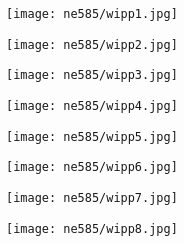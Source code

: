 \documentclass[aspectratio=1610,pdftex,dvipsnames,compress,xcolor={dvipsnames}]{beamer}
\begin{document}
\begin{frame}{}
    \begin{figure}
        \centering
        \texttt{[image: ne585/wipp1.jpg]}
    \end{figure}
\end{frame}


\begin{frame}{}
    \begin{figure}
        \centering
        \texttt{[image: ne585/wipp2.jpg]}
    \end{figure}
\end{frame}


\begin{frame}{}
    \begin{figure}
        \centering
        \texttt{[image: ne585/wipp3.jpg]}
    \end{figure}
\end{frame}


\begin{frame}{}
    \begin{figure}
        \centering
        \texttt{[image: ne585/wipp4.jpg]}
    \end{figure}
\end{frame}


\begin{frame}{}
    \begin{figure}
        \centering
        \texttt{[image: ne585/wipp5.jpg]}
    \end{figure}
\end{frame}


\begin{frame}{}
    \begin{figure}
        \centering
        \texttt{[image: ne585/wipp6.jpg]}
    \end{figure}
\end{frame}


\begin{frame}{}
    \begin{figure}
        \centering
        \texttt{[image: ne585/wipp7.jpg]}
    \end{figure}
\end{frame}


\begin{frame}{}
    \begin{figure}
        \centering
        \texttt{[image: ne585/wipp8.jpg]}
    \end{figure}
\end{frame}
\end{document}
